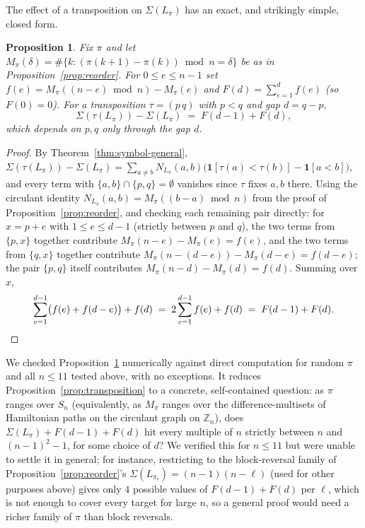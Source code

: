 \documentclass[11pt]{amsart}
\newtheorem{proposition}[theorem]{Proposition}
\begin{document}
The effect of a transposition on $\Sigma(L_\pi)$ has an exact, and strikingly simple, closed form.

\begin{proposition}\label{prop:delta-gap}
Fix $\pi$ and let $M_\pi(\delta)=\#\{k: (\pi(k{+}1)-\pi(k))\bmod n=\delta\}$ be as in Proposition~\ref{prop:reorder}. For $0\le e\le n-1$ set $f(e)=M_\pi((n-e)\bmod n)-M_\pi(e)$ and $F(d)=\sum_{e=1}^d f(e)$ (so $F(0)=0$). For a transposition $\tau=(p\,q)$ with $p<q$ and gap $d=q-p$,
\[
\Sigma(\tau(L_\pi)) - \Sigma(L_\pi) \;=\; F(d-1)+F(d),
\]
which depends on $p,q$ only through the gap $d$.
\end{proposition}

\begin{proof}
By Theorem~\ref{thm:symbol-general}, $\Sigma(\tau(L_\pi))-\Sigma(L_\pi)=\sum_{a\ne b}N_{L_\pi}(a,b)\bigl(\mathbf{1}[\tau(a)<\tau(b)]-\mathbf{1}[a<b]\bigr)$, and every term with $\{a,b\}\cap\{p,q\}=\emptyset$ vanishes since $\tau$ fixes $a,b$ there. Using the circulant identity $N_{L_\pi}(a,b)=M_\pi((b-a)\bmod n)$ from the proof of Proposition~\ref{prop:reorder}, and checking each remaining pair directly: for $x=p+e$ with $1\le e\le d-1$ (strictly between $p$ and $q$), the two terms from $\{p,x\}$ together contribute $M_\pi(n-e)-M_\pi(e)=f(e)$, and the two terms from $\{q,x\}$ together contribute $M_\pi(n-(d-e))-M_\pi(d-e)=f(d-e)$; the pair $\{p,q\}$ itself contributes $M_\pi(n-d)-M_\pi(d)=f(d)$. Summing over $x$,
\[
\sum_{e=1}^{d-1}\bigl(f(e)+f(d-e)\bigr) + f(d) \;=\; 2\sum_{e=1}^{d-1}f(e)+f(d) \;=\; F(d-1)+F(d). \qedhere
\]
\end{proof}

We checked Proposition~\ref{prop:delta-gap} numerically against direct computation for random $\pi$ and all $n\le 11$ tested above, with no exceptions. It reduces Proposition~\ref{prop:transposition} to a concrete, self-contained question: as $\pi$ ranges over $S_n$ (equivalently, as $M_\pi$ ranges over the difference-multisets of Hamiltonian paths on the circulant graph on $\mathbb Z_n$), does $\Sigma(L_\pi)+F(d-1)+F(d)$ hit every multiple of $n$ strictly between $n$ and $(n-1)^2-1$, for some choice of $d$? We verified this for $n\le 11$ but were unable to settle it in general; for instance, restricting to the block-reversal family of Proposition~\ref{prop:reorder}'s $\Sigma(L_{\pi_\ell})=(n-1)(n-\ell)$ (used for other purposes above) gives only $4$ possible values of $F(d-1)+F(d)$ per $\ell$, which is not enough to cover every target for large $n$, so a general proof would need a richer family of $\pi$ than block reversals.
\end{document}
